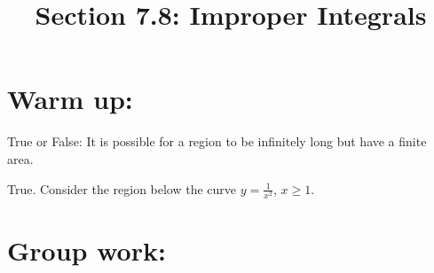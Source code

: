 \documentclass[noinstructornotes]{ximera}
\title{Section 7.8: Improper Integrals}
\begin{document}
\begin{abstract}		\end{abstract}
\maketitle




\section{Warm up:}
True or False:  It is possible for a region to be infinitely long but have a finite area.
	\begin{freeResponse}
	True.  Consider the region below the curve $y=\frac{1}{x^2}$, $x \geq 1$.
	\end{freeResponse}
	
\begin{instructorNotes}

\end{instructorNotes}





\section{Group work:}
\end{document}

